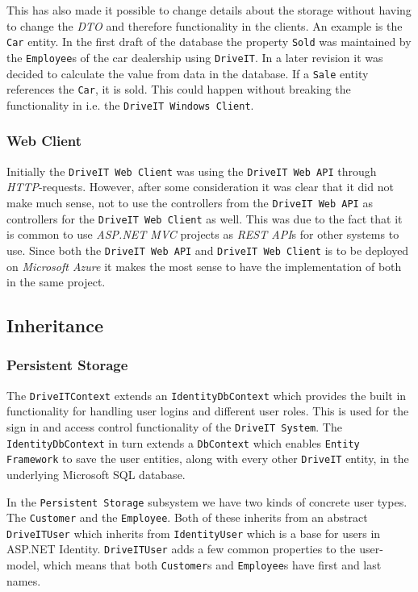 This has also made it possible to change details about the storage without having to change the \textit{DTO} and therefore functionality in the clients. An example is the \texttt{Car} entity. In the first draft of the database the property \texttt{Sold} was maintained by the \texttt{Employee}s of the car dealership using \texttt{DriveIT}. In a later revision it was decided to calculate the value from data in the database. If a \texttt{Sale} entity references the \texttt{Car}, it is sold. This could happen without breaking the functionality in i.e. the \texttt{DriveIT Windows Client}.

\subsubsection{Web Client}
Initially the \texttt{DriveIT Web Client} was using the \texttt{DriveIT Web API} through \textit{HTTP}-requests. However, after some consideration it was clear that it did not make much sense, not to use the controllers from the \texttt{DriveIT Web API} as controllers for the \texttt{DriveIT Web Client} as well. This was due to the fact that it is common to use \textit{ASP.NET MVC} projects as \textit{REST API}s for other systems to use. Since both the \texttt{DriveIT Web API} and \texttt{DriveIT Web Client} is to be deployed on \textit{Microsoft Azure} it makes the most sense to have the implementation of both in the same project.

\subsection{Inheritance}
\subsubsection{Persistent Storage}
The \texttt{DriveITContext} extends an \texttt{IdentityDbContext} which provides the built in functionality for handling user logins and different user roles. This is used for the sign in and access control functionality of the \texttt{DriveIT System}.
The \texttt{IdentityDbContext} in turn extends a \texttt{DbContext} which enables \texttt{Entity Framework} to save the user entities, along with every other \texttt{DriveIT} entity, in the underlying Microsoft SQL database.

In the \texttt{Persistent Storage} subsystem we have two kinds of concrete user types. The \texttt{Customer} and the \texttt{Employee}. Both of these inherits from an abstract \texttt{DriveITUser} which inherits from \texttt{IdentityUser} which is a base for users in ASP.NET Identity. \texttt{DriveITUser} adds a few common properties to the user-model, which means that both \texttt{Customer}s and \texttt{Employee}s have first and last names.
